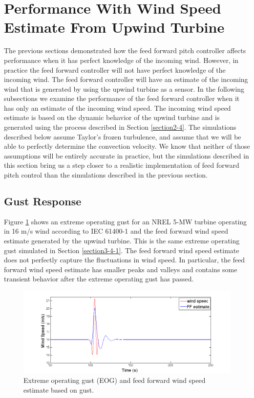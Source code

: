 \section{Performance With Wind Speed Estimate From Upwind Turbine} \label{section3-5}
The previous sections demonstrated how the feed forward pitch controller affects performance when it has perfect knowledge of the incoming wind. However, in practice the feed forward controller will not have perfect knowledge of the incoming wind. The feed forward controller will have an estimate of the incoming wind that is generated by using the upwind turbine as a sensor. In the following subsections we examine the performance of the feed forward controller when it has only an estimate of the incoming wind speed. The incoming wind speed estimate is based on the dynamic behavior of the upwind turbine and is generated using the process described in Section \ref{section2-4}. The simulations described below assume Taylor's frozen turbulence, and assume that we will be able to perfectly determine the convection velocity. We know that neither of those assumptions will be entirely accurate in practice, but the simulations described in this section bring us a step closer to a realistic implementation of feed forward pitch control than the simulations described in the previous section.

\subsection{Gust Response} \label{section3-5-1}
Figure \ref{fig3-24} shows an extreme operating gust for an NREL 5-MW turbine operating in 16 m/s wind according to IEC 61400-1 \cite{IEC2005} and the feed forward wind speed estimate generated by the upwind turbine. This is the same extreme operating gust simulated in Section \ref{section3-4-1}. The feed forward wind speed estimate does not perfectly capture the fluctuations in wind speed. In particular, the feed forward wind speed estimate has smaller peaks and valleys and contains some transient behavior after the extreme operating gust has passed.



\begin{figure}[htb]
	\centering
		\includegraphics[width = \linewidth]{Figures/ch3Figures/fig3-24.png}
		
	\caption{Extreme operating gust (EOG) and feed forward wind speed estimate based on gust.}
	\label{fig3-24}
\end{figure}

